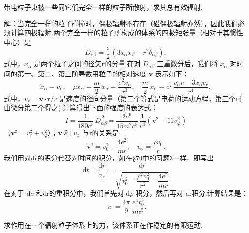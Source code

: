 \begin{xiti}

\quad 带电粒子束被一些同它们完全一样的粒子所散射，求其总有效辐射.

解：当完全一样的粒子碰撞时，偶极辐射不存在（磁偶极辐射亦然），因此我们必须计算四极辐射.两个完全一样的粒子所构成的体系的四极矩张量（相对于其惯性中心）是
\begin{equation*}
  D_{\alpha\beta}=\frac{e}{2}\,(3x_\alpha x_\beta-r^2\delta_{\alpha\beta}),
\end{equation*}
式中，$x_\alpha$ 是两个粒子之间的径矢$\boldsymbol{r}$的分量.在对 $D_{\alpha\beta}$ 三重微分后，我们将 $x_\alpha$ 对时间的第一、第二、第三阶导数用粒子的相对速度 $\boldsymbol{v}$ 表示如下：
\begin{equation*}
  \dot{x}_\alpha=v_\alpha,\quad
  \mu\ddot{x}_\alpha=\frac{m}{2}\,\ddot{x}_\alpha=\frac{e^2x_\alpha}{r^3},\quad
  \frac{m}{2}\,\dddot{x}_\alpha=e^2\,\frac{v_\alpha r-3x_\alpha v_r}{r^4},
\end{equation*}
式中，$v_r=\boldsymbol{v}\cdot\boldsymbol{r}/r$ 是速度的径向分量（第二个等式是电荷的运动方程，第三个可由微分第二个得之).计算得出下面的强度的表达式：
\begin{equation*}
  I=\frac{1}{180c^5}\,\dddot{D}_{\alpha\beta}^{\,2}
  =\frac{2e^6}{15m^2c^5}\,\frac{1}{r^4}\left(\boldsymbol{v}^2+11v_\varphi^2\right)
\end{equation*}
（$\boldsymbol{v}^2=v_r^2+v_\varphi^2$）；$\boldsymbol{v}$ 和 $v_\varphi$ 与r的关系是
\begin{equation*}
  \boldsymbol{v}^2=v_0^2-\frac{4e^2}{mr},\quad
  v_\varphi=\frac{\rho v_0}{r}.
\end{equation*}
我们用对dr的积分代替对时间的积分，如在§70中的习题3一样，即写出
\begin{equation*}
  \mathrm{d}t=\frac{\mathrm{d}r}{v_r}
  =\frac{\mathrm{d}r}{\sqrt{v_0^2-\dfrac{\rho^2v_0^2}{r^2}-\dfrac{4e^2}{mr}}}
\end{equation*}
在对于 $\mathrm{d}\rho$ 和dr的重积分中，我们首先对 $\mathrm{d}\rho$ 积分，然后再对 dr积分.计算结果是：
\begin{equation*}
  \varkappa=\frac{4\pi}{9}\,\frac{e^4v_0^3}{mc^5}.
\end{equation*}

\quad 求作用在一个辐射粒子体系上的力，该体系正在作稳定的有限运动.


\end{xiti}
